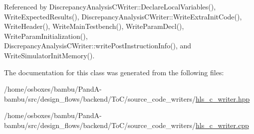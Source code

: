Referenced by Discrepancy\+Analysis\+C\+Writer\+::\+Declare\+Local\+Variables(), Write\+Expected\+Results(), Discrepancy\+Analysis\+C\+Writer\+::\+Write\+Extra\+Init\+Code(), Write\+Header(), Write\+Main\+Testbench(), Write\+Param\+Decl(), Write\+Param\+Initialization(), Discrepancy\+Analysis\+C\+Writer\+::write\+Post\+Instruction\+Info(), and Write\+Simulator\+Init\+Memory().



The documentation for this class was generated from the following files\+:\begin{DoxyCompactItemize}
\item 
/home/osboxes/bambu/\+Pand\+A-\/bambu/src/design\+\_\+flows/backend/\+To\+C/source\+\_\+code\+\_\+writers/\hyperlink{hls__c__writer_8hpp}{hls\+\_\+c\+\_\+writer.\+hpp}\item 
/home/osboxes/bambu/\+Pand\+A-\/bambu/src/design\+\_\+flows/backend/\+To\+C/source\+\_\+code\+\_\+writers/\hyperlink{hls__c__writer_8cpp}{hls\+\_\+c\+\_\+writer.\+cpp}\end{DoxyCompactItemize}
